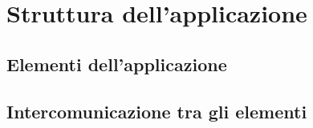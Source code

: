 \chapter{Struttura dell'applicazione}
\section{Elementi dell'applicazione}
\section{Intercomunicazione tra gli elementi}
